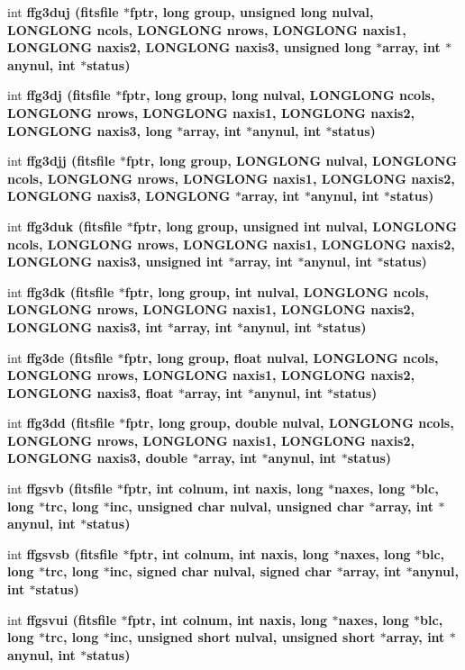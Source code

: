 \begin{CompactItemize}
\item 
int \bf{ffg3duj} (\bf{fitsfile} $\ast$fptr, long group, unsigned long nulval, \bf{LONGLONG} ncols, \bf{LONGLONG} nrows, \bf{LONGLONG} naxis1, \bf{LONGLONG} naxis2, \bf{LONGLONG} naxis3, unsigned long $\ast$array, int $\ast$anynul, int $\ast$status)
\item 
int \bf{ffg3dj} (\bf{fitsfile} $\ast$fptr, long group, long nulval, \bf{LONGLONG} ncols, \bf{LONGLONG} nrows, \bf{LONGLONG} naxis1, \bf{LONGLONG} naxis2, \bf{LONGLONG} naxis3, long $\ast$array, int $\ast$anynul, int $\ast$status)
\item 
int \bf{ffg3djj} (\bf{fitsfile} $\ast$fptr, long group, \bf{LONGLONG} nulval, \bf{LONGLONG} ncols, \bf{LONGLONG} nrows, \bf{LONGLONG} naxis1, \bf{LONGLONG} naxis2, \bf{LONGLONG} naxis3, \bf{LONGLONG} $\ast$array, int $\ast$anynul, int $\ast$status)
\item 
int \bf{ffg3duk} (\bf{fitsfile} $\ast$fptr, long group, unsigned int nulval, \bf{LONGLONG} ncols, \bf{LONGLONG} nrows, \bf{LONGLONG} naxis1, \bf{LONGLONG} naxis2, \bf{LONGLONG} naxis3, unsigned int $\ast$array, int $\ast$anynul, int $\ast$status)
\item 
int \bf{ffg3dk} (\bf{fitsfile} $\ast$fptr, long group, int nulval, \bf{LONGLONG} ncols, \bf{LONGLONG} nrows, \bf{LONGLONG} naxis1, \bf{LONGLONG} naxis2, \bf{LONGLONG} naxis3, int $\ast$array, int $\ast$anynul, int $\ast$status)
\item 
int \bf{ffg3de} (\bf{fitsfile} $\ast$fptr, long group, float nulval, \bf{LONGLONG} ncols, \bf{LONGLONG} nrows, \bf{LONGLONG} naxis1, \bf{LONGLONG} naxis2, \bf{LONGLONG} naxis3, float $\ast$array, int $\ast$anynul, int $\ast$status)
\item 
int \bf{ffg3dd} (\bf{fitsfile} $\ast$fptr, long group, double nulval, \bf{LONGLONG} ncols, \bf{LONGLONG} nrows, \bf{LONGLONG} naxis1, \bf{LONGLONG} naxis2, \bf{LONGLONG} naxis3, double $\ast$array, int $\ast$anynul, int $\ast$status)
\item 
int \bf{ffgsvb} (\bf{fitsfile} $\ast$fptr, int colnum, int naxis, long $\ast$naxes, long $\ast$blc, long $\ast$trc, long $\ast$inc, unsigned char nulval, unsigned char $\ast$array, int $\ast$anynul, int $\ast$status)
\item 
int \bf{ffgsvsb} (\bf{fitsfile} $\ast$fptr, int colnum, int naxis, long $\ast$naxes, long $\ast$blc, long $\ast$trc, long $\ast$inc, signed char nulval, signed char $\ast$array, int $\ast$anynul, int $\ast$status)
\item 
int \bf{ffgsvui} (\bf{fitsfile} $\ast$fptr, int colnum, int naxis, long $\ast$naxes, long $\ast$blc, long $\ast$trc, long $\ast$inc, unsigned short nulval, unsigned short $\ast$array, int $\ast$anynul, int $\ast$status)

\end{CompactItemize}

